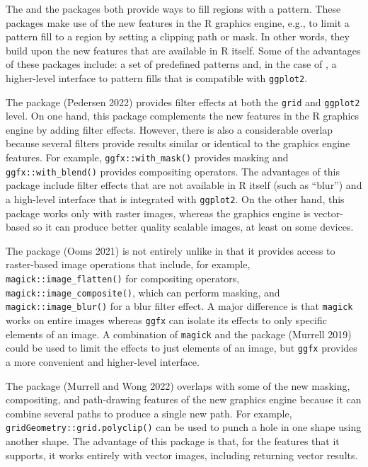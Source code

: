 The  and
the  packages both provide ways to fill regions
with a pattern. These packages make use of the
new features in the R graphics engine, e.g., to limit a pattern fill
to a region by setting a clipping path or mask. In other words, they
build upon the new features that are available in R itself.
Some of the advantages of these packages include:
a set of predefined patterns and, in the case of ,
a higher-level interface to pattern fills that is compatible with
\texttt{ggplot2}.

The  package (Pedersen 2022) provides filter effects
at both the \texttt{grid} and \texttt{ggplot2} level.
On one hand, this package complements the new features in the R graphics
engine by adding filter effects.
However, there is also a considerable overlap because several filters
provide results similar or identical to the graphics engine features.
For example,
\texttt{ggfx::with\_mask()} provides masking and \texttt{ggfx::with\_blend()} provides
compositing operators.
The advantages of this package include filter effects that are
not available in R itself (such as ``blur'') and a high-level interface
that is integrated with \texttt{ggplot2}.
On the other hand, this package works only with raster images,
whereas the graphics engine is vector-based
so it can produce better quality scalable images, at least on
some devices.

The  package (Ooms 2021) is not entirely unlike
 in that it provides access to raster-based image
operations that include, for example,
\texttt{magick::image\_flatten()} for compositing
operators, \texttt{magick::image\_composite()}, which can perform masking,
and \texttt{magick::image\_blur()} for a blur filter effect.
A major difference is that \texttt{magick} works on entire
images whereas \texttt{ggfx} can isolate its effects to only specific
elements of an image. A combination of \texttt{magick}
and the  package (Murrell 2019) could be used
to limit the effects to just elements of an image, but \texttt{ggfx}
provides a more convenient and higher-level interface.

The  package (Murrell and Wong 2022) overlaps
with some of the new masking, compositing, and path-drawing features
of the new graphics engine because
it can combine several paths to produce a single new path.
For example, \texttt{gridGeometry::grid.polyclip()} can be used to
punch a hole in one shape using another shape.
The advantage of this package is that, for the features that it
supports, it works entirely with
vector images, including returning vector results.


